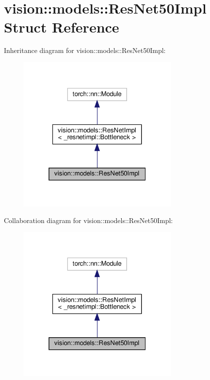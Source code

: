 \hypertarget{structvision_1_1models_1_1ResNet50Impl}{}\section{vision\+:\+:models\+:\+:Res\+Net50\+Impl Struct Reference}
\label{structvision_1_1models_1_1ResNet50Impl}


Inheritance diagram for vision\+:\+:models\+:\+:Res\+Net50\+Impl\+:
\nopagebreak
\begin{figure}[H]
\begin{center}
\leavevmode
\includegraphics[width=229pt]{structvision_1_1models_1_1ResNet50Impl__inherit__graph}
\end{center}
\end{figure}


Collaboration diagram for vision\+:\+:models\+:\+:Res\+Net50\+Impl\+:
\nopagebreak
\begin{figure}[H]
\begin{center}
\leavevmode
\includegraphics[width=229pt]{structvision_1_1models_1_1ResNet50Impl__coll__graph}
\end{center}
\end{figure}
